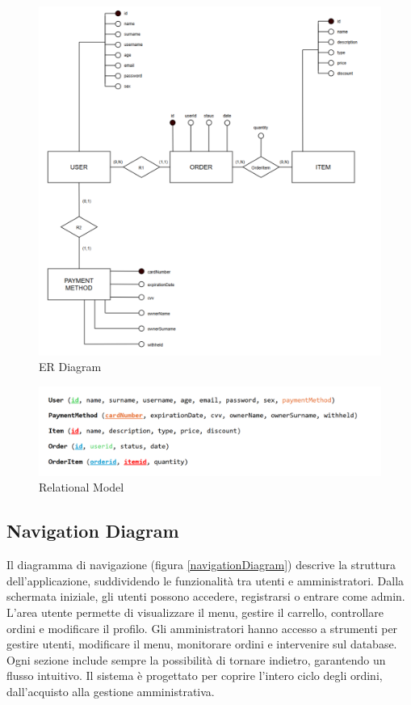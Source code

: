 \documentclass{article}
\begin{document}
\vspace{1cm}

\begin{figure}[h]
    \centering
    \includegraphics[width=1\linewidth]{imgs/ER_m.png}
    \caption{ER Diagram}
    \label{er}
\end{figure}

\begin{figure}
    \centering
    \includegraphics[width=1.0\linewidth]{imgs/RelationalModel.png}
    \caption{Relational Model}
    \label{RelationalModel}
\end{figure}

\newpage

\subsection{Navigation Diagram}
Il diagramma di navigazione (figura \ref{navigationDiagram}) descrive la struttura dell'applicazione, suddividendo le funzionalità tra utenti e amministratori. Dalla schermata iniziale, gli utenti possono accedere, registrarsi o entrare come admin. L'area utente permette di visualizzare il menu, gestire il carrello, controllare ordini e modificare il profilo. Gli amministratori hanno accesso a strumenti per gestire utenti, modificare il menu, monitorare ordini e intervenire sul database. Ogni sezione include sempre la possibilità di tornare indietro, garantendo un flusso intuitivo. Il sistema è progettato per coprire l'intero ciclo degli ordini, dall'acquisto alla gestione amministrativa.
\end{document}
